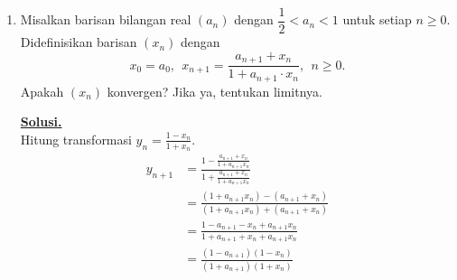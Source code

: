 \documentclass[12pt,twoside]{article}
\newenvironment{solution}
{
	\par\noindent\textbf{\underline{Solusi.}}\\
}
{
	\par
}
\begin{document}
\begin{enumerate}
\begin{solution}
          \textbf{(a) Nilai Eigen $AB$}
          Tinjau aksi $AB$:
          $AB y_1 = A(B y_1)$. Perhatikan $B y_1 = B([0, 2, 0, 0]^T) = 2b_2$.
          $AB y_1 = A(2b_2) = 2(A b_2) = 2y_1$.
          Jadi $y_1$ adalah vektor eigen dengan $\lambda=2$.

          $AB y_2 = A(B y_2)$. Perhatikan $B y_2 = B([2, 0, 2, 2]^T) = 2b_1 + 2b_3 + 2b_4$.
          $AB y_2 = A(2(b_1+b_3+b_4)) = 2 A(b_1+b_3+b_4) = 2y_2$.
          Jadi $y_2$ adalah vektor eigen dengan $\lambda=2$.

          Karena rank $A$ maksimal 2 (karena ukurannya $4 \times 2$), rank $AB$ juga maksimal 2.
          Maka dimensi ruang eigen 0 (ker $AB$) minimal $4-2=2$.
          Dua nilai eigen lainnya adalah 0.
          Nilai eigen $AB$ adalah $2, 2, 0, 0$.

          \textbf{(b) Buktikan $BA = 2I$}
          Untuk setiap $x \in \text{Range}(A)$, $ABx = 2x$.
          Ambil sebarang $v \in \mathbb{R}^2$. Maka $Av \in \text{Range}(A)$.
          $AB(Av) = 2(Av) \implies A(BAv - 2v) = 0$.
          Artinya $(BAv - 2v) \in \text{Null}(A)$.
          Namun, $\text{dim}(\text{Null}(A)) = 2 - \text{dim}(\text{Range}(A))$.
          Karena $y_1, y_2 \in \text{Range}(A)$ bebas linier, $\text{dim}(\text{Range}(A)) = 2$.
          Maka $\text{dim}(\text{Null}(A)) = 0$.
          Sehingga $BAv - 2v = 0 \implies BAv = 2v$ untuk setiap $v \in \mathbb{R}^2$.
          Jadi $BA = 2I$.
        \end{solution}
  \item Misalkan barisan bilangan real $(a_n)$ dengan $\dfrac{1}{2}<a_n<1$ untuk setiap $n\geq 0$. Didefinisikan barisan $(x_n)$ dengan
        $$ x_0=a_0, ~~x_{n+1}= \dfrac{a_{n+1}+x_n}{1+a_{n+1}\cdot x_n}, ~~n\geq 0.$$
        Apakah $(x_n)$ konvergen? Jika ya, tentukan limitnya.
        \begin{solution}
          Hitung transformasi $y_n = \frac{1-x_n}{1+x_n}$.
          \begin{align*}
            y_{n+1} & = \frac{1 - \frac{a_{n+1}+x_n}{1+a_{n+1}x_n}}{1 + \frac{a_{n+1}+x_n}{1+a_{n+1}x_n}} \\
                    & = \frac{(1+a_{n+1}x_n) - (a_{n+1}+x_n)}{(1+a_{n+1}x_n) + (a_{n+1}+x_n)}             \\
                    & = \frac{1 - a_{n+1} - x_n + a_{n+1}x_n}{1 + a_{n+1} + x_n + a_{n+1}x_n}             \\
                    & = \frac{(1-a_{n+1})(1-x_n)}{(1+a_{n+1})(1+x_n)}                                     \\

\end{align*}
\end{solution}
\end{enumerate}
\end{document}

